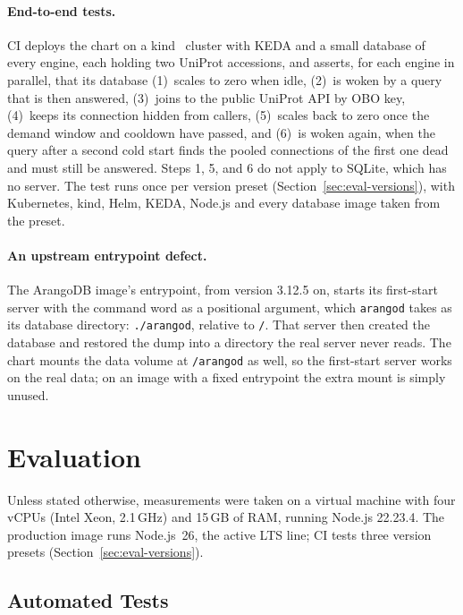 \documentclass[sigconf,nonacm]{acmart}
\begin{document}
\paragraph{End-to-end tests.}
CI deploys the chart on a kind~\cite{kind} cluster with KEDA and a
small database of every engine, each holding two UniProt accessions,
and asserts, for each engine in parallel, that its database
(1)~scales to zero when idle, (2)~is woken by
a query that is then answered, (3)~joins to the public UniProt API by
OBO key, (4)~keeps its connection hidden from callers, (5)~scales back
to zero once the demand window and cooldown have passed, and (6)~is
woken again, when the query after a second cold start finds the pooled
connections of the first one dead and must still be answered.  Steps
1, 5, and 6 do not apply to SQLite, which has no server.  The test
runs once per version preset (Section~\ref{sec:eval-versions}), with
Kubernetes, kind, Helm, KEDA, Node.js and every database image taken
from the preset.

\paragraph{An upstream entrypoint defect.}
The ArangoDB image's entrypoint, from version 3.12.5 on, starts its
first-start server with the command word as a positional argument,
which \texttt{arangod} takes as its database directory:
\texttt{./arangod}, relative to \texttt{/}.  That server then created
the database and restored the dump into a directory the real server
never reads.  The chart mounts the data volume at \texttt{/arangod} as
well, so the first-start server works on the real data; on an image
with a fixed entrypoint the extra mount is simply unused.

\section{Evaluation}
\label{sec:evaluation}

Unless stated otherwise, measurements were taken on a virtual machine
with four vCPUs (Intel Xeon, 2.1\,GHz) and 15\,GB of RAM, running
Node.js 22.23.4.  The production image runs Node.js~26, the active LTS
line; CI tests three version presets (Section~\ref{sec:eval-versions}).

\subsection{Automated Tests}
\end{document}
